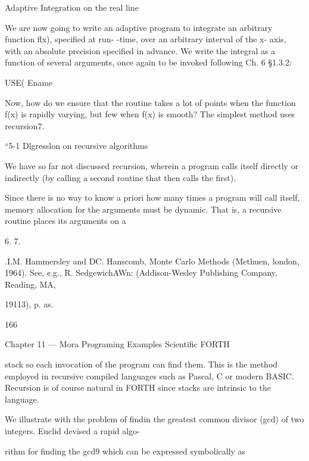 Adaptive Integration on the real line

We are now going to write an adaptive program to integrate an
arbitrary function ﬂx), specified at run- -time, over an
arbitrary interval of the x- axis, with an absolute precision
speciﬁed in advance. We write the integral as a function of several
arguments, once again to be invoked following Ch. 6 §1.3.2:

USE( Ename %

Now, how do we ensure that the routine takes a lot of points when
the function f(x) is rapidly varying, but few when f(x) is smooth?
The simplest method uses recursion7.

“5-1 Dlgresslon on recursive algorithms

We have so far not discussed recursion, wherein a program calls
itself directly or indirectly (by calling a second routine that
then calls the ﬁrst).

Since there is no way to know a priori how many times a program
will call itself, memory allocation for the arguments must be
dynamic. That is, a recursive routine places its arguments on a

 

6.
7.

.I.M. Hammersley and DC. Hanscomb, Monte Carlo Methods (Methuen, london, 1964).
See, ¢.g., R. SedgewichAWn: (Addison-Wesley Publishing Company, Reading, MA,

19113), p. as.

166

Chapter 11 — Mora Programing Examples Scientiﬁc FORTH

stack so each invocation of the program can ﬁnd them. This is the
method employed in recursive compiled languages such as Pascal,
C or modern BASIC. Recursion is of course natural in FORTH
since stacks are intrinsic to the language.

We illustrate with the problem of ﬁndin the greatest common
divisor (gcd) of two integers. Euclid devised a rapid algo-

rithm for ﬁnding the gcd9 which can be expressed symbolically
as

